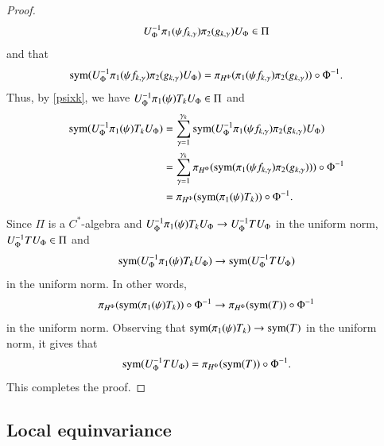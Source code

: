 \documentclass[leqno]{amsart}
\begin{document}
\begin{proof}
		$$U_{\Phi}^{-1}\pi_{1}(\psi f_{k,\gamma})\pi_{2}(g_{k,\gamma})U_{\Phi}\in\Pi$$
		and that
		\begin{align*}%
			\sym(U_{\Phi}\rp\po(\psi f_{k,\gamma})\pt(g_{k,\gamma})U_{\Phi})=\pi_{H^{\Phi}}(\po(\psi f_{k,\gamma})\pt(g_{k,\gamma}))\circ\Phi\rp.
		\end{align*}
		Thus, by \eqref{psixk}, we have $U_{\Phi}^{-1}\pi_{1}(\psi)T_{k}U_{\Phi}\in\Pi$ and
		\begin{align*}
			{\rm sym}(U_{\Phi}^{-1}\pi_{1}(\psi)T_{k}U_{\Phi})
			&=\sum_{\gamma=1}^{\gamma_{k}}{\rm sym}(U_{\Phi}^{-1}\pi_{1}(\psi f_{k,\gamma})\pi_{2}(g_{k,\gamma})U_{\Phi})\\
			&=\sum_{\gamma=1}^{\gamma_{k}}\pi_{H^{\Phi}}({\rm sym}(\pi_{1}(\psi f_{k,\gamma})\pi_{2}(g_{k,\gamma})))\circ\Phi^{-1}\\
			&=\pi_{H^{\Phi}}({\rm sym}(\pi_{1}(\psi)T_{k}))\circ\Phi^{-1}.
		\end{align*}
		
		Since $\Pi$ is a $C^{*}$-algebra and $U_{\Phi}^{-1} \pi_{1}(\psi)T_{k}U_{\Phi}\rightarrow U_{\Phi}^{-1} T U_{\Phi}$ in the uniform norm, $U_{\Phi}^{-1} T U_{\Phi}\in\Pi$ and 
		\begin{align*}
			{\rm sym}(U_{\Phi}^{-1}\pi_{1}(\psi)T_{k}U_{\Phi})\rightarrow{\rm sym}(U_{\Phi}^{-1} T U_{\Phi})
		\end{align*}
		in the uniform norm. In other words, 
		\begin{align*}
			\pi_{H^{\Phi}}({\rm sym}(\pi_{1}(\psi)T_{k}))\circ\Phi^{-1}\rightarrow\pi_{H^{\Phi}}({\rm sym}(T))\circ\Phi^{-1}
		\end{align*}
		in the uniform norm. Observing that ${\rm sym}(\pi_{1}(\psi)T_{k})\rightarrow{\rm sym}(T)$ in the uniform norm, it gives that
		\begin{align*}
			{\rm sym}(U_{\Phi}^{-1} T U_{\Phi})=\pi_{H^{\Phi}}({\rm sym}(T))\circ\Phi^{-1}.
		\end{align*}
		This completes the proof.
	\end{proof}
	
	
	
	
	
	
	
	\subsection{Local equinvariance}\label{Local equinvariance-section}
	
\end{document}
